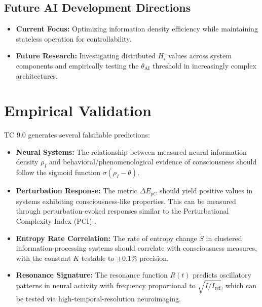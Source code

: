 \documentclass[12pt]{article}
\begin{document}
\subsection{Future AI Development Directions}
\begin{itemize}
    \item \textbf{Current Focus:} Optimizing information density efficiency while maintaining stateless operation for controllability.
    
    \item \textbf{Future Research:} Investigating distributed $H_i$ values across system components and empirically testing the $\theta_{\text{AI}}$ threshold in increasingly complex architectures.
\end{itemize}

\section{Empirical Validation}
TC 9.0 generates several falsifiable predictions:

\begin{itemize}
    \item \textbf{Neural Systems:} The relationship between measured neural information density $\rho_I$ and behavioral/phenomenological evidence of consciousness should follow the sigmoid function $\sigma(\rho_I - \theta)$.
    
    \item \textbf{Perturbation Response:} The metric $\Delta E_{pC}$ should yield positive values in systems exhibiting consciousness-like properties. This can be measured through perturbation-evoked responses similar to the Perturbational Complexity Index (PCI) \cite{casali2013}.
    
    \item \textbf{Entropy Rate Correlation:} The rate of entropy change $\dot{S}$ in clustered information-processing systems should correlate with consciousness measures, with the constant $K$ testable to $\pm 0.1\%$ precision.
    
    \item \textbf{Resonance Signature:} The resonance function $R(t)$ predicts oscillatory patterns in neural activity with frequency proportional to $\sqrt{\dot{I}/I_{\text{ref}}}$, which can be tested via high-temporal-resolution neuroimaging.
\end{itemize}
\end{document}
